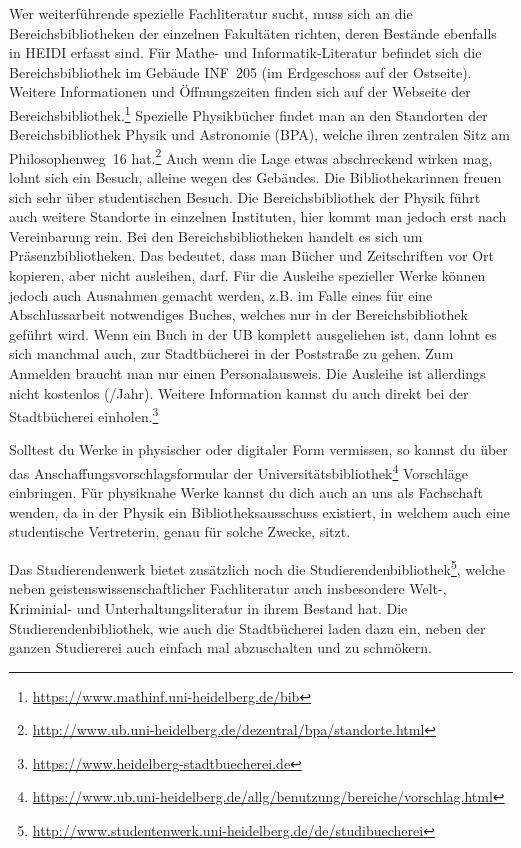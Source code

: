 Wer weiterführende spezielle Fachliteratur sucht, muss sich an die Bereichsbibliotheken der einzelnen Fakultäten richten, deren Bestände ebenfalls in \gls{HEIDI} erfasst sind. Für Mathe- und Informatik-Literatur befindet sich die Bereichsbibliothek im Gebäude \gls{INF}~205 (im Erdgeschoss auf der Ostseite). Weitere Informationen und Öffnungszeiten finden sich auf der Webseite der Bereichsbibliothek.\footnote{\url{https://www.mathinf.uni-heidelberg.de/bib}} Spezielle Physikbücher findet man an den Standorten der Bereichsbibliothek Physik und Astronomie (BPA), welche ihren zentralen Sitz am Philosophenweg~16 hat.\footnote{\url{http://www.ub.uni-heidelberg.de/dezentral/bpa/standorte.html}} Auch wenn die Lage etwas abschreckend wirken mag, lohnt sich ein Besuch, alleine wegen des Gebäudes. Die Bibliothekarinnen freuen sich sehr über studentischen Besuch. Die Bereichsbibliothek der Physik führt auch weitere Standorte in einzelnen Instituten, hier kommt man jedoch erst nach Vereinbarung rein.
Bei den Bereichsbibliotheken handelt es sich um Präsenzbibliotheken. Das bedeutet, dass man Bücher und Zeitschriften vor Ort kopieren, aber nicht ausleihen, darf. Für die Ausleihe spezieller Werke können jedoch auch Ausnahmen gemacht werden, z.B. im Falle eines für eine Abschlussarbeit notwendiges Buches, welches nur in der Bereichsbibliothek geführt wird.
Wenn ein Buch in der UB komplett ausgeliehen ist, dann lohnt es sich manchmal auch, zur Stadtbücherei in der Poststraße zu gehen. Zum Anmelden braucht man nur einen Personalausweis. Die Ausleihe ist allerdings nicht kostenlos (/Jahr). Weitere Information kannst du auch direkt bei der Stadtbücherei einholen.\footnote{\url{https://www.heidelberg-stadtbuecherei.de}}

Solltest du Werke in physischer oder digitaler Form vermissen, so kannst du über das Anschaffungsvorschlagsformular der Universitätsbibliothek\footnote{\url{https://www.ub.uni-heidelberg.de/allg/benutzung/bereiche/vorschlag.html}} Vorschläge einbringen. Für physiknahe Werke kannst du dich auch an uns als Fachschaft wenden, da in der Physik ein Bibliotheksausschuss existiert, in welchem auch eine studentische Vertreterin, genau für solche Zwecke, sitzt.
 
Das Studierendenwerk bietet zusätzlich noch die Studierendenbibliothek\footnote{\url{http://www.studentenwerk.uni-heidelberg.de/de/studibuecherei}}, welche neben geistenswissenschaftlicher Fachliteratur auch insbesondere Welt-, Kriminial- und Unterhaltungsliteratur in ihrem Bestand hat. Die Studierendenbibliothek, wie auch die Stadtbücherei laden dazu ein, neben der ganzen Studiererei auch einfach mal abzuschalten und zu schmökern.
